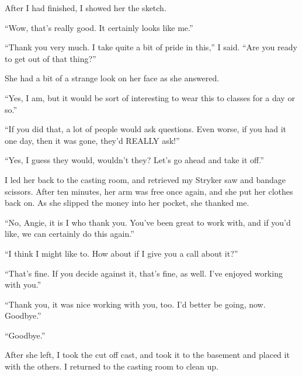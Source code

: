 After I had finished, I showed her the sketch.

``Wow, that's really good. It certainly looks like me.''

``Thank you very much. I take quite a bit of pride in this,'' I said. ``Are you ready to get out
of that thing?''

She had a bit of a strange look on her face as she answered.

``Yes, I am, but it would be sort of interesting to wear this to classes for a day or so.''

``If you did that, a lot of people would ask questions. Even worse, if you had it one day, then
it was gone, they'd REALLY ask!''

``Yes, I guess they would, wouldn't they? Let's go ahead and take it off.''

I led her back to the casting room, and retrieved my Stryker saw and bandage scissors. After ten
minutes, her arm was free once again, and she put her clothes back on. As she slipped the money
into her pocket, she thanked me.

``No, Angie, it is I who thank you. You've been great to work with, and if you'd like, we can
certainly do this again.''

``I think I might like to. How about if I give you a call about it?''

``That's fine. If you decide against it, that's fine, as well. I've enjoyed working with you.''

``Thank you, it was nice working with you, too. I'd better be going, now. Goodbye.''

``Goodbye.''

After she left, I took the cut off cast, and took it to the basement and placed it with the
others. I returned to the casting room to clean up.
